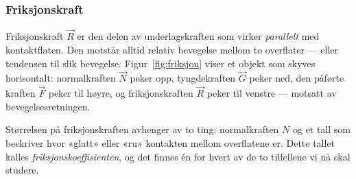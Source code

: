 
\subsubsection{Friksjonskraft}

\noindent
\begin{minipage}[t]{0.54\linewidth}
\vspace{0pt}
Friksjonskraft $\vec{R}$ er den delen av underlagskraften som virker \textit{parallelt} med kontaktflaten. Den motstår alltid relativ bevegelse mellom to overflater — eller tendensen til slik bevegelse. Figur~\ref{fig:friksjon} viser et objekt som skyves horisontalt: normalkraften $\vec{N}$ peker opp, tyngdekraften $\vec{G}$ peker ned, den påførte kraften $\vec{F}$ peker til høyre, og friksjonskraften $\vec{R}$ peker til venstre — motsatt av bevegelsesretningen.

Størrelsen på friksjonskraften avhenger av to ting: normalkraften $N$ og et tall som beskriver hvor «glatt» eller «ru» kontakten mellom overflatene er. Dette tallet kalles \textit{friksjonskoeffisienten}, og det finnes én for hvert av de to tilfellene vi nå skal studere.
\end{minipage}%
\hfill
